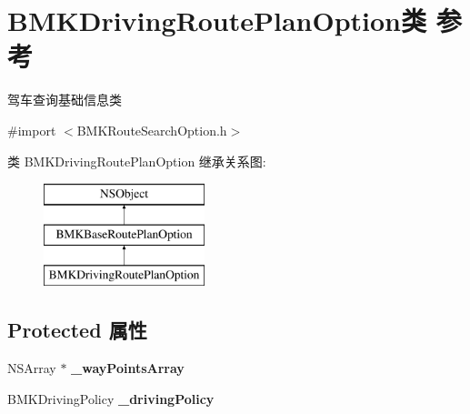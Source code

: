 \hypertarget{interface_b_m_k_driving_route_plan_option}{\section{B\+M\+K\+Driving\+Route\+Plan\+Option类 参考}
\label{interface_b_m_k_driving_route_plan_option}
}


驾车查询基础信息类  




{\ttfamily \#import $<$B\+M\+K\+Route\+Search\+Option.\+h$>$}

类 B\+M\+K\+Driving\+Route\+Plan\+Option 继承关系图\+:\begin{figure}[H]
\begin{center}
\leavevmode
\includegraphics[height=3.000000cm]{interface_b_m_k_driving_route_plan_option}
\end{center}
\end{figure}
\subsection*{Protected 属性}
\begin{DoxyCompactItemize}
\item 
\hypertarget{interface_b_m_k_driving_route_plan_option_aac7dd49a6a8f7133ff8207b59bbb03ab}{N\+S\+Array $\ast$ {\bfseries \+\_\+way\+Points\+Array}}\label{interface_b_m_k_driving_route_plan_option_aac7dd49a6a8f7133ff8207b59bbb03ab}

\item 
\hypertarget{interface_b_m_k_driving_route_plan_option_a6378c481740e1aff326001bff3c28738}{B\+M\+K\+Driving\+Policy {\bfseries \+\_\+driving\+Policy}}\label{interface_b_m_k_driving_route_plan_option_a6378c481740e1aff326001bff3c28738}

\end{DoxyCompactItemize}
